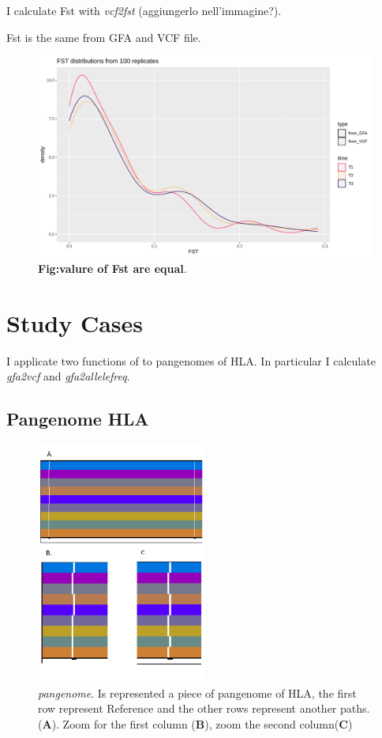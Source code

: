 I calculate Fst with \textit{vcf2fst} (aggiungerlo nell'immagine?). %

Fst is the same from GFA and VCF file.


\begin{figure}[H]
\centering
\includegraphics[width=1.00\textwidth]{fig/fst_time (1).png}
\decoRule
\caption{\textbf{Fig:valure of Fst are equal}.}
\label{fig:fsttime.png}
\end{figure}






\section{Study Cases}

I applicate two functions of \vgp to pangenomes of HLA. In particular I calculate \textit{gfa2vcf} and \textit{gfa2allelefreq}.

\subsection{Pangenome HLA}

\begin{figure}[H]
\centering
\includegraphics[width=0.50\textwidth]{fig/pangenome.pdf}
\decoRule
\caption{\textit{pangenome}. Is represented a piece of pangenome of HLA, the first row represent Reference and the other rows represent another paths. (\textbf{A}). Zoom for the first column  (\textbf{B}), zoom the second column(\textbf{C})}
\label{fig:pangenome.pdf}
\end{figure}


